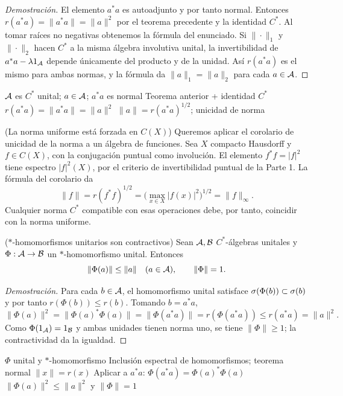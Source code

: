 \begin{proof}[Demostración]
El elemento $a^*a$ es autoadjunto y por tanto normal. Entonces
$r(a^*a)=\|a^*a\|=\|a\|^2$ por el teorema precedente y la identidad $C^*$.
Al tomar raíces no negativas obtenemos la fórmula del enunciado.
Si $\|\cdot\|_1$ y $\|\cdot\|_2$ hacen $C^*$ a la misma álgebra involutiva
unital, la invertibilidad de $a^*a-\lambda1_\mathcal A$ depende únicamente del producto
y de la unidad. Así $r(a^*a)$ es el mismo para ambas normas, y la fórmula da
$\|a\|_1=\|a\|_2$ para cada $a\in\mathcal A$.
\end{proof}

\proofdiagram
{$\mathcal A$ es $C^*$ unital; $a\in\mathcal A$; $a^*a$ es normal}
{Teorema anterior + identidad $C^*$}
{$r(a^*a)=\|a^*a\|=\|a\|^2$}
{$\|a\|=r(a^*a)^{1/2}$; unicidad de norma}

\begin{cthejemplo}{(La norma uniforme está forzada en $C(X)$)}
Queremos aplicar el corolario de unicidad de la norma a un álgebra
de funciones. Sea $X$ compacto Hausdorff y $f\in C(X)$, con la
conjugación puntual como involución. El elemento
$f^*f=|f|^2$ tiene espectro $|f|^2(X)$, por el criterio de
invertibilidad puntual de la Parte 1. La fórmula del corolario da
\[
 \|f\|=r(f^*f)^{1/2}
 =\bigl(\max_{x\in X}|f(x)|^2\bigr)^{1/2}
 =\|f\|_\infty.
\]
Cualquier norma $C^*$ compatible con esas operaciones debe,
por tanto, coincidir con la norma uniforme.
\end{cthejemplo}

\begin{cthteorema}{($*$-homomorfismos unitarios son contractivos)}
Sean $\mathcal A,\mathcal B$ $C^*$-álgebras unitales y $\Phi:\mathcal A\to\mathcal B$ un $*$-homomorfismo unital. Entonces
\[
 \|\Phi(a)\|\le\|a\|\quad(a\in\mathcal A),
 \qquad \|\Phi\|=1.
\]
\end{cthteorema}

\begin{proof}[Demostración]
Para cada $b\in\mathcal A$, el homomorfismo unital satisface
$\sigma(\Phi(b))\subset\sigma(b)$ y por tanto
$r(\Phi(b))\le r(b)$. Tomando $b=a^*a$,
\[
\|\Phi(a)\|^2
=\|\Phi(a)^*\Phi(a)\|
=\|\Phi(a^*a)\|
=r(\Phi(a^*a))
\le r(a^*a)=\|a\|^2.
\]
Como $\Phi(1_\mathcal A)=1_\mathcal B$ y ambas unidades tienen norma uno, se tiene
$\|\Phi\|\ge1$; la contractividad da la igualdad.
\end{proof}

\proofdiagram
{$\Phi$ unital y $*$-homomorfismo}
{Inclusión espectral de homomorfismos; teorema normal $\|x\|=r(x)$}
{Aplicar a $a^*a$: $\Phi(a^*a)=\Phi(a)^*\Phi(a)$}
{$\|\Phi(a)\|^2\le\|a\|^2$ y $\|\Phi\|=1$}

